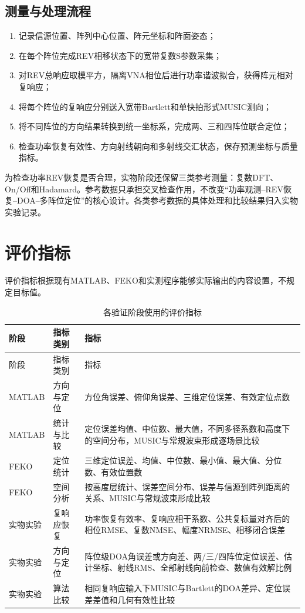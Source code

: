 \documentclass[UTF8,a4paper,12pt]{ctexart}
\begin{document}
\subsection{测量与处理流程}

\begin{enumerate}
  \item 记录信源位置、阵列中心位置、阵元坐标和阵面姿态；
  \item 在每个阵位完成REV相移状态下的宽带复数S参数采集；
  \item 对REV总响应取模平方，隔离VNA相位后进行功率谐波拟合，获得阵元相对复响应；
  \item 将每个阵位的复响应分别送入宽带Bartlett和单快拍形式MUSIC测向；
  \item 将不同阵位的方向结果转换到统一坐标系，完成两、三和四阵位联合定位；
  \item 检查功率恢复有效性、方向射线朝向和多射线交汇状态，保存预测坐标与质量指标。
\end{enumerate}

为检查功率REV恢复是否合理，实物阶段还保留三类参考测量：复数DFT、On/Off和Hadamard。参考数据只承担交叉检查作用，不改变“功率观测--REV恢复--DOA--多阵位定位”的核心设计。各类参考数据的具体处理和比较结果归入实物实验记录。

\section{评价指标}

评价指标根据现有MATLAB、FEKO和实测程序能够实际输出的内容设置，不规定目标值。

\begin{longtable}{>{\raggedright\arraybackslash}p{3.0cm}>{\raggedright\arraybackslash}p{4.1cm}>{\raggedright\arraybackslash}p{7.2cm}}
\caption{各验证阶段使用的评价指标}\\
\toprule
阶段 & 指标类别 & 指标\\
\midrule
\endfirsthead
\toprule
阶段 & 指标类别 & 指标\\
\midrule
\endhead
\bottomrule
\endfoot
MATLAB & 方向与定位 & 方位角误差、俯仰角误差、三维定位误差、有效定位点数\\
MATLAB & 统计与比较 & 定位误差均值、中位数、最大值，不同多径系数和高度下的空间分布，MUSIC与常规波束形成逐场景比较\\
FEKO & 定位统计 & 三维定位误差、均值、中位数、最小值、最大值、分位数、有效位置数\\
FEKO & 空间分析 & 按高度层统计、误差空间分布、误差与信源到阵列距离的关系、MUSIC与常规波束形成比较\\
实物实验 & 复响应恢复 & 功率恢复有效率、复响应相干系数、公共复标量对齐后的相位RMSE、复数NMSE、幅度NRMSE、相移闭合误差\\
实物实验 & 方向与定位 & 阵位级DOA角误差或方向差、两/三/四阵位定位误差、估计坐标、射线RMS、全部射线向前检查、数值有效解比例\\
实物实验 & 算法比较 & 相同复响应输入下MUSIC与Bartlett的DOA差异、定位误差差值和几何有效性比较\\
\end{longtable}
\end{document}
